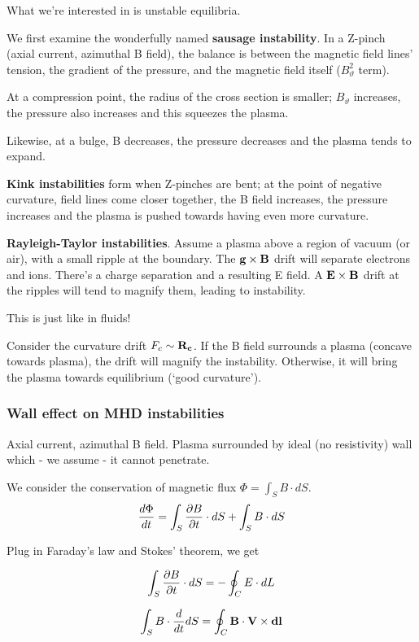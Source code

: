 \documentclass[PlasmaNotes.tex]{subfiles}
\begin{document}
What we're interested in is unstable equilibria.

We first examine the wonderfully named \textbf{sausage instability}. In a Z-pinch (axial current, azimuthal B field), the balance is between the magnetic field lines' tension, the gradient of the pressure, and the magnetic field itself ($B_{\vartheta}^2$ term).

At a compression point, the radius of the cross section is smaller; $B_{\vartheta}$ increases, the pressure also increases and this squeezes the plasma.

Likewise, at a bulge, B decreases, the pressure decreases and the plasma tends to expand.

\textbf{Kink instabilities} form when Z-pinches are bent; at the point of negative curvature, field lines come closer together, the B field increases, the pressure increases and the plasma is pushed towards having even more curvature.

\textbf{Rayleigh-Taylor instabilities}. Assume a plasma above a region of vacuum (or air), with a small ripple at the boundary. The $\mathbf{g} \times \mathbf{B}$ drift will separate electrons and ions. There's a charge separation and a resulting E field. A $\mathbf{E} \times \mathbf{B}$ drift at the ripples will tend to magnify them, leading to instability.

This is just like in fluids!

Consider the curvature drift $F_c \sim \mathbf{R_c}$. If the B field surrounds a plasma (concave towards plasma), the drift will magnify the instability. Otherwise, it will bring the plasma towards equilibrium (`good curvature').

\subsubsection{Wall effect on MHD instabilities}

Axial current, azimuthal B field. Plasma surrounded by ideal (no resistivity) wall which - we assume - it cannot penetrate.

We consider the conservation of magnetic flux $\Phi = \int_S{B \cdot dS}$.
\[ \frac{d \Phi}{d t} = \int_S{\frac{\partial B}{\partial t} \cdot dS} + \int_S{B \cdot dS} \]

Plug in Faraday's law and Stokes' theorem, we get

\[ \int_S{\frac{\partial B}{\partial t} \cdot dS } = - \oint_C{E \cdot dL} \]

\[ \int_S{B \cdot \frac{d }{d t} dS} = \oint_C{\mathbf{B} \cdot \mathbf{\mathbf{V} \times \mathbf{dl}}}\]
\end{document}
